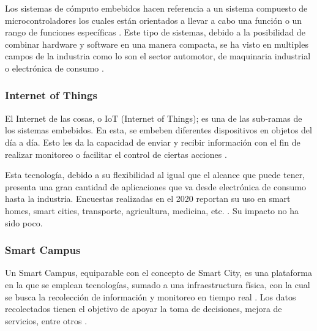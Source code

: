 \documentclass[12pt]{article}
\begin{document}
    Los sistemas de cómputo embebidos hacen referencia a un sistema compuesto de microcontroladores los cuales están orientados a llevar a cabo una función o un rango de funciones específicas \cite{heath2002embedded}. Este tipo de sistemas, debido a la posibilidad de combinar hardware y software en una manera compacta, se ha visto en multiples campos de la industria como lo son el sector automotor, de maquinaria industrial o electrónica de consumo \cite{deichmann_2022}.


    \subsubsection*{Internet of Things}


    El Internet de las cosas, o IoT (Internet of Things); es una de las sub-ramas de los sistemas embebidos. En esta, se embeben diferentes dispositivos en objetos del día a día. Esto les da la capacidad de enviar y recibir información con el fin de realizar monitoreo o facilitar el control de ciertas acciones \cite{Berte_2018}.

    Esta tecnología, debido a su flexibilidad al igual que el alcance que puede tener, presenta una gran cantidad de aplicaciones que va desde electrónica de consumo hasta la industria. Encuestas realizadas en el 2020 reportan su uso en smart homes, smart cities, transporte, agricultura, medicina, etc. \cite{Dawood_2020}. Su impacto no ha sido poco.


    \subsubsection*{Smart Campus}


    Un Smart Campus, equiparable con el concepto de Smart City, es una plataforma en la que se emplean tecnologías, sumado a una infraestructura física, con la cual se busca la recolección de información y monitoreo en tiempo real \cite{MinAllah2020}. Los datos recolectados tienen el objetivo de apoyar la toma de decisiones, mejora de servicios, entre otros \cite{Anagnostopoulos_2023}.
\end{document}
